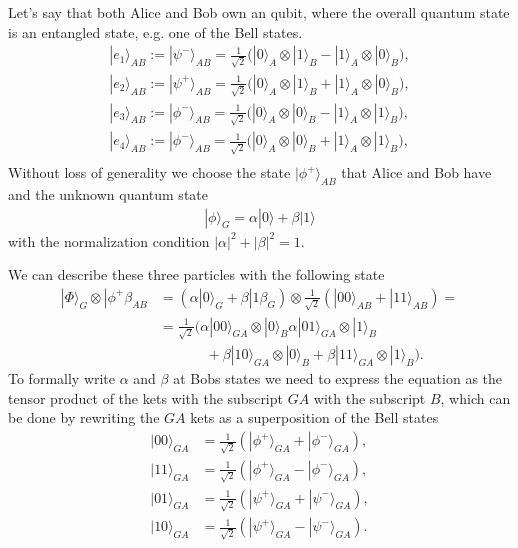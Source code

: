 \documentclass[a4paper]{article}
\begin{document}
Let's say that both Alice and Bob own an qubit, where the overall quantum state
is an entangled state, e.g. one of the Bell states.
\begin{align}
    |e_1\rangle_{AB} := |\psi^-\rangle_{AB} =
    \frac{1}{\sqrt{2}}\bigg(|0\rangle_A \otimes|1\rangle_B - |1\rangle_A
    \otimes |0\rangle_B\bigg),\\
    |e_2\rangle_{AB} := |\psi^+\rangle_{AB} =
    \frac{1}{\sqrt{2}}\bigg(|0\rangle_A \otimes|1\rangle_B + |1\rangle_A
    \otimes |0\rangle_B\bigg),\\
    |e_3\rangle_{AB} := |\phi^-\rangle_{AB} =
    \frac{1}{\sqrt{2}}\bigg(|0\rangle_A \otimes|0\rangle_B - |1\rangle_A
    \otimes |1\rangle_B\bigg),\\
    |e_4\rangle_{AB} := |\phi^-\rangle_{AB} =
    \frac{1}{\sqrt{2}}\bigg(|0\rangle_A \otimes|0\rangle_B + |1\rangle_A
    \otimes |1\rangle_B\bigg),\\
\end{align}
Without loss of generality we choose the state $|\phi^+\rangle_{AB}$ that Alice
and Bob have and the unknown quantum state
\begin{align}
    |\phi\rangle_G = \alpha |0\rangle + \beta |1\rangle
\end{align}
with the normalization condition $|\alpha|^2 + |\beta|^2 = 1$.

We can describe these three particles with the following state
\begin{align}
    |\Phi\rangle_G \otimes |\phi^+\beta_{AB} &= (\alpha|0\rangle_G +\beta |1\beta_G)
    \otimes \frac{1}{\sqrt{2}} (|00\rangle_{AB} + |11\rangle_{AB})=\\
    &= \frac{1}{\sqrt{2}} (\alpha |00\rangle_{GA}\otimes |0\rangle_B
    \alpha|01\rangle_{GA}\otimes |1\rangle_B\\
    &\;\;\;\;\;\;\;\;\;\;\;\;+\beta |10\rangle_{GA}\otimes |0\rangle_B + \beta
    |11\rangle_{GA}\otimes
    |1\rangle_B)\label{eq:factor}.
\end{align}
To formally write $\alpha$ and $\beta$ at Bobs states we need to
express the equation as the tensor product of the kets with the subscript
$GA$ with the subscript $B$, which can be done by rewriting the $GA$ kets as
a superposition of the Bell states
\begin{align}
    |00\rangle_{GA} &= \frac{1}{\sqrt{2}}(|\phi^+\rangle_{GA}+
    |\phi^-\rangle_{GA}),\\
    |11\rangle_{GA} &= \frac{1}{\sqrt{2}}(|\phi^+\rangle_{GA} -
    |\phi^-\rangle_{GA}),\\
    |01\rangle_{GA} &= \frac{1}{\sqrt{2}}(|\psi^+\rangle_{GA}+
    |\psi^-\rangle_{GA}),\\
    |10\rangle_{GA} &= \frac{1}{\sqrt{2}}(|\psi^+\rangle_{GA}-
    |\psi^-\rangle_{GA}).
\end{align}
\end{document}

